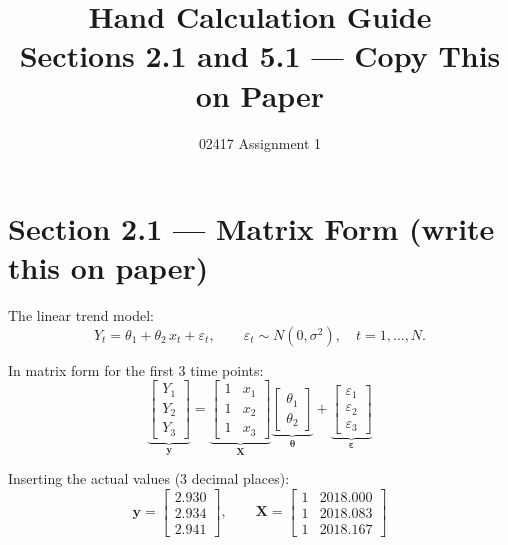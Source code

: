 \documentclass[11pt,a4paper]{article}
\title{Hand Calculation Guide\\[4pt]\large Sections 2.1 and 5.1 --- Copy This on Paper}
\author{02417 Assignment 1}
\date{}
\begin{document}
\maketitle

\section*{Section 2.1 --- Matrix Form (write this on paper)}

The linear trend model:
\[
Y_t = \theta_1 + \theta_2 \, x_t + \varepsilon_t, \qquad \varepsilon_t \sim N(0, \sigma^2), \quad t = 1, \ldots, N.
\]

In matrix form for the first 3 time points:
\[
\underbrace{\begin{bmatrix} Y_1 \\ Y_2 \\ Y_3 \end{bmatrix}}_{\boldsymbol{y}}
=
\underbrace{\begin{bmatrix} 1 & x_1 \\ 1 & x_2 \\ 1 & x_3 \end{bmatrix}}_{\boldsymbol{X}}
\underbrace{\begin{bmatrix} \theta_1 \\ \theta_2 \end{bmatrix}}_{\boldsymbol{\theta}}
+
\underbrace{\begin{bmatrix} \varepsilon_1 \\ \varepsilon_2 \\ \varepsilon_3 \end{bmatrix}}_{\boldsymbol{\varepsilon}}
\]

Inserting the actual values (3 decimal places):
\[
\boldsymbol{y} = \begin{bmatrix} 2.930 \\ 2.934 \\ 2.941 \end{bmatrix}, \qquad
\boldsymbol{X} = \begin{bmatrix} 1 & 2018.000 \\ 1 & 2018.083 \\ 1 & 2018.167 \end{bmatrix}
\]
\end{document}
